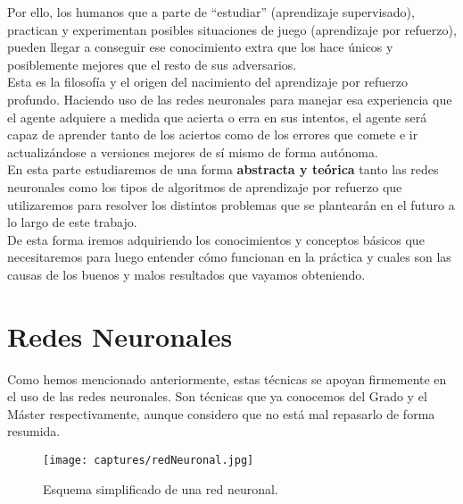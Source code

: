 \documentclass[11pt,fleqn]{book} %
\begin{document}
Por ello, los humanos que a parte de ``estudiar'' (aprendizaje supervisado), practican y experimentan posibles situaciones de juego (aprendizaje por refuerzo), pueden llegar a conseguir ese conocimiento extra que los hace únicos y posiblemente mejores que el resto de sus adversarios. \\

Esta es la filosofía y el origen del nacimiento del aprendizaje por refuerzo profundo. Haciendo uso de las redes neuronales para manejar esa experiencia que el agente adquiere a medida que acierta o erra en sus intentos, el agente será capaz de aprender tanto de los aciertos como de los errores que comete e ir actualizándose a versiones mejores de sí mismo de forma autónoma. \\

En esta parte estudiaremos de una forma \textbf{abstracta y teórica} tanto las redes neuronales como los tipos de algoritmos de aprendizaje por refuerzo que utilizaremos para resolver los distintos problemas que se plantearán en el futuro a lo largo de este trabajo. \\

De esta forma iremos adquiriendo los conocimientos y conceptos básicos que necesitaremos para luego entender cómo funcionan en la práctica y cuales son las causas de los buenos y malos resultados que vayamos obteniendo.

\chapter{Redes Neuronales}\label{sec:deeplearning}

Como hemos mencionado anteriormente, estas técnicas se apoyan firmemente en el uso de las redes neuronales. Son técnicas que ya conocemos del Grado y el Máster respectivamente, aunque considero que no está mal repasarlo de forma resumida. \cite{article:redesNeuronalesMicrosoft} \cite{book:TFGredes} \cite{book:berzal} \cite{article:redesNeuronales} \cite{article:RLromero} \\

\begin{figure}[H]
	\centering\texttt{[image: captures/redNeuronal.jpg]}
	\caption{Esquema simplificado de una red neuronal. \cite{article:redNeuronal}}
	\label{fig:redNeuronal} %
\end{figure}
\end{document}
